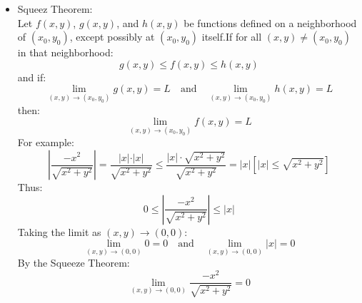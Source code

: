 \begin{itemize}
then the characteristic nature and qualitative stability of the critical point at the origin $(0,0)$ for the non-linear system (1) is the same as that of the corresponding linearized system:
\item Squeez Theorem:\\
Let $f(x, y)$, $g(x, y)$, and $h(x, y)$ be functions defined on a neighborhood of $(x_0, y_0)$, except possibly at $(x_0, y_0)$ itself.If for all $(x, y) \neq (x_0, y_0)$ in that neighborhood:$$g(x, y) \le f(x, y) \le h(x, y)$$and if:$$\lim_{(x,y) \to (x_0, y_0)} g(x, y) = L \quad \text{and} \quad \lim_{(x,y) \to (x_0, y_0)} h(x, y) = L$$then:$$\lim_{(x,y) \to (x_0, y_0)} f(x, y) = L$$
For example:\\
$$\left\vert{} \frac{-x^2}{\sqrt{x^2 + y^2}} \right\vert{} = \frac{\vert{}x\vert{} \cdot \vert{}x\vert{}}{\sqrt{x^2 + y^2}} \le \frac{\vert{}x\vert{} \cdot \sqrt{x^2 + y^2}}{\sqrt{x^2 + y^2}} = \vert{}x\vert{} \left[\vert{}x\vert{} \le \sqrt{x^2+y^2}\right]$$Thus:$$0 \le \left\vert{} \frac{-x^2}{\sqrt{x^2 + y^2}} \right\vert{} \le \vert{}x\vert{}$$Taking the limit as $(x,y) \to (0,0)$:$$\lim_{(x,y) \to (0,0)} 0 = 0 \quad \text{and} \quad \lim_{(x,y) \to (0,0)} \vert{}x\vert{} = 0$$By the Squeeze Theorem:$$\lim_{(x,y) \to (0,0)} \frac{-x^2}{\sqrt{x^2 + y^2}} = 0$$
\end{itemize}
